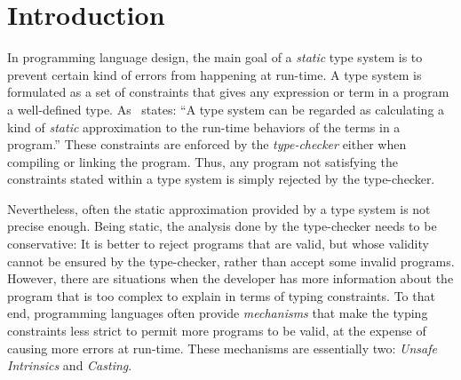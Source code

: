 

\chapter{Introduction}

In programming language design, the main goal of a \emph{static} type system is to prevent certain kind of errors from happening at run-time.
A type system is formulated as a set of constraints that gives any expression or term in a program a well-defined type.
As~\cite{pierceTypesProgrammingLanguages2002} states: ``A type system can be regarded as calculating a kind of \emph{static} approximation to the run-time behaviors of the terms in a program.''
These constraints are enforced by the \emph{type-checker} either when compiling or linking the program.
Thus, any program not satisfying the constraints stated within a type system is simply rejected by the type-checker.

Nevertheless, often the static approximation provided by a type system is not precise enough.
Being static, the analysis done by the type-checker needs to be conservative:
It is better to reject programs that are valid,
but whose validity cannot be ensured by the type-checker,
rather than accept some invalid programs.
However, there are situations when the developer has more information
about the program that is too complex to explain in terms of typing constraints.
To that end, programming languages often provide \emph{mechanisms} that 
make the typing constraints less strict
to permit more programs to be valid,
at the expense of causing more errors at run-time.
These mechanisms are essentially two:
\emph{Unsafe Intrinsics} and \emph{Casting}.

